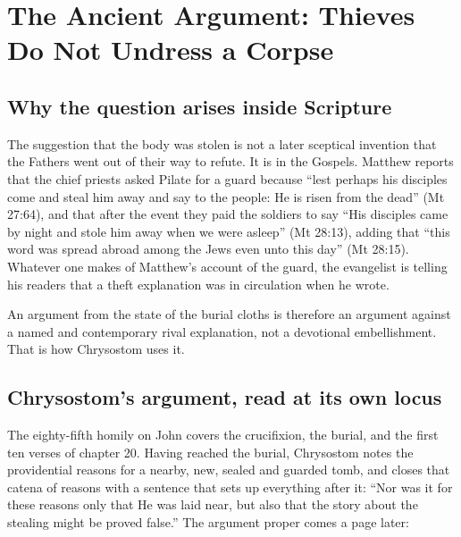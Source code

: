 \section{The Ancient Argument: Thieves Do Not Undress a Corpse}

\subsection{Why the question arises inside Scripture}

The suggestion that the body was stolen is not a later sceptical invention that
the Fathers went out of their way to refute. It is in the Gospels. Matthew
reports that the chief priests asked Pilate for a guard because ``lest perhaps
his disciples come and steal him away and say to the people: He is risen from
the dead'' (Mt 27:64), and that after the event they paid the soldiers to say
``His disciples came by night and stole him away when we were asleep'' (Mt
28:13), adding that ``this word was spread abroad among the Jews even unto this
day'' (Mt 28:15). Whatever one makes of Matthew's account of the guard, the
evangelist is telling his readers that a theft explanation was in circulation
when he wrote.

An argument from the state of the burial cloths is therefore an argument
against a named and contemporary rival explanation, not a devotional
embellishment. That is how Chrysostom uses it.

\subsection{Chrysostom's argument, read at its own locus}

The eighty-fifth homily on John covers the crucifixion, the burial, and the
first ten verses of chapter 20. Having reached the burial, Chrysostom notes the
providential reasons for a nearby, new, sealed and guarded tomb, and closes
that catena of reasons with a sentence that sets up everything after it: ``Nor
was it for these reasons only that He was laid near, but also that the story
about the stealing might be proved false.'' The argument proper comes a page
later:

